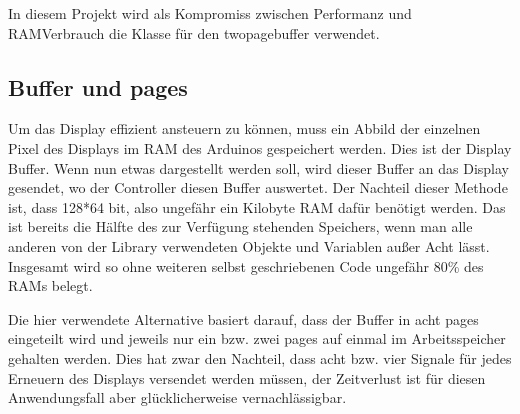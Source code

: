 \documentclass[letterpaper,10pt,ngerman]{sphinxmanual}
\begin{document}
In diesem Projekt wird als Kompromiss zwischen Performanz und RAM\sphinxhyphen{}Verbrauch
die Klasse für den two\sphinxhyphen{}page\sphinxhyphen{}buffer verwendet.


\subsection{Buffer und pages}
\label{\detokenize{programming:buffer-und-pages}}
Um das Display effizient ansteuern zu können, muss
ein Abbild der einzelnen Pixel des Displays im RAM des Arduinos gespeichert
werden. Dies ist der Display Buffer. Wenn nun etwas dargestellt werden soll,
wird dieser Buffer an das Display gesendet, wo der Controller diesen Buffer
auswertet. Der Nachteil dieser Methode ist, dass 128*64 bit, also ungefähr ein
Kilobyte RAM dafür benötigt werden. Das ist bereits die Hälfte des zur
Verfügung stehenden Speichers, wenn man alle anderen von der Library
verwendeten Objekte und Variablen außer Acht lässt. Insgesamt wird so ohne
weiteren selbst geschriebenen Code ungefähr 80\% des RAMs belegt.

Die hier verwendete Alternative basiert darauf, dass der Buffer in acht pages
eingeteilt wird und jeweils nur ein bzw. zwei pages auf einmal im
Arbeitsspeicher gehalten werden. Dies hat zwar den Nachteil, dass acht bzw.
vier Signale für jedes Erneuern des Displays versendet werden müssen, der
Zeitverlust ist für diesen Anwendungsfall aber glücklicherweise
vernachlässigbar.
\end{document}
